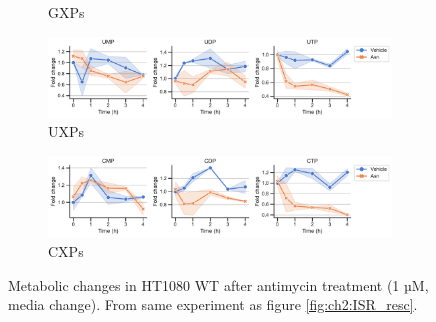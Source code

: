 \begin{figure}[ht]
\begin{subfigure}[b]{0.63\textwidth}
        \caption{GXPs}
        \label{fig:app_ch2:HT1080_Anti_gxp}
    \end{subfigure}
    \hfill
    \begin{subfigure}[b]{0.63\textwidth}
        \includegraphics[width=\textwidth]{figures/chap2/app/HT1080_Anti_uxp.pdf}
        \caption{UXPs}
        \label{fig:app_ch2:HT1080_Anti_uxp}
    \end{subfigure}
    \hfill
    \begin{subfigure}[b]{0.63\textwidth}
        \includegraphics[width=\textwidth]{figures/chap2/app/HT1080_Anti_cxp.pdf}
        \caption{CXPs}
        \label{fig:app_ch2:HT1080_Anti_cxp}
    \end{subfigure}
    \hfill
        \caption[Metabolic changes in HT1080 after antimycin treatment.]{
        Metabolic changes in HT1080 WT after antimycin treatment (1 µM, media change).
        From same experiment as figure \ref{fig:ch2:ISR_resc}.
        }
        \label{fig:app_ch2:HT1080_Anti_metab}
\end{figure}




